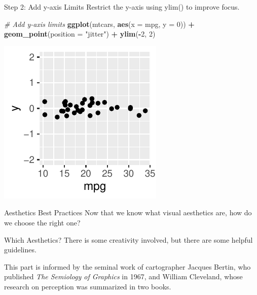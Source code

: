 \documentclass[
  ignorenonframetext,
]{beamer}
\newenvironment{Shaded}{\begin{snugshade}}{\end{snugshade}}
\newcommand{\AttributeTok}[1]{\textcolor[rgb]{0.13,0.29,0.53}{#1}}
\newcommand{\CommentTok}[1]{\textcolor[rgb]{0.56,0.35,0.01}{\textit{#1}}}
\newcommand{\DecValTok}[1]{\textcolor[rgb]{0.00,0.00,0.81}{#1}}
\newcommand{\FunctionTok}[1]{\textcolor[rgb]{0.13,0.29,0.53}{\textbf{#1}}}
\newcommand{\NormalTok}[1]{#1}
\newcommand{\SpecialCharTok}[1]{\textcolor[rgb]{0.81,0.36,0.00}{\textbf{#1}}}
\newcommand{\StringTok}[1]{\textcolor[rgb]{0.31,0.60,0.02}{#1}}
\begin{document}
\begin{frame}[fragile]{Step 2: Add y-axis Limits}
\label{step-2-add-y-axis-limits}
Restrict the y-axis using ylim() to improve focus.


\begin{Shaded}
\begin{Highlighting}[]
\CommentTok{\# Add y{-}axis limits}
\FunctionTok{ggplot}\NormalTok{(mtcars, }\FunctionTok{aes}\NormalTok{(}\AttributeTok{x =}\NormalTok{ mpg, }\AttributeTok{y =} \DecValTok{0}\NormalTok{)) }\SpecialCharTok{+} \FunctionTok{geom\_point}\NormalTok{(}\AttributeTok{position =} \StringTok{"jitter"}\NormalTok{) }\SpecialCharTok{+}
    \FunctionTok{ylim}\NormalTok{(}\SpecialCharTok{{-}}\DecValTok{2}\NormalTok{, }\DecValTok{2}\NormalTok{)}
\end{Highlighting}
\end{Shaded}

\begin{center}\includegraphics[width=0.5\linewidth]{Figs/unnamed-chunk-32-1} \end{center}
\end{frame}

\begin{frame}{Aesthetics Best Practices}
\label{aesthetics-best-practices}
Now that we know what visual aesthetics are, how do we choose the right
one?
\end{frame}

\begin{frame}{Which Aesthetics?}
\label{which-aesthetics}
There is some creativity involved, but there are some helpful
guidelines.

This part is informed by the seminal work of cartographer Jacques
Bertin, who published \emph{The Semiology of Graphics} in 1967, and
William Cleveland, whose research on perception was summarized in two
books.
\end{frame}
\end{document}
